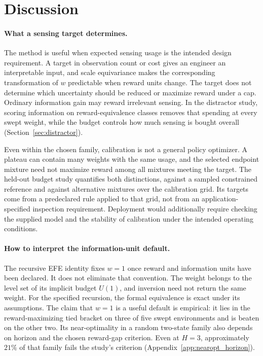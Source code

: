\section{Discussion}
\label{sec:discussion}

\paragraph{What a sensing target determines.}
The method is useful when expected sensing usage is the intended design requirement. A target in observation count or cost gives an engineer an interpretable input, and scale equivariance makes the corresponding transformation of $w$ predictable when reward units change. The target does not determine which uncertainty should be reduced or maximize reward under a cap. Ordinary information gain may reward irrelevant sensing. In the distractor study, scoring information on reward-equivalence classes removes that spending at every swept weight, while the budget controls how much sensing is bought overall (Section~\ref{sec:distractor}).

Even within the chosen family, calibration is not a general policy optimizer. A plateau can contain many weights with the same usage, and the selected endpoint mixture need not maximize reward among all mixtures meeting the target. The held-out budget study quantifies both distinctions, against a sampled constrained reference and against alternative mixtures over the calibration grid. Its targets come from a predeclared rule applied to that grid, not from an application-specified inspection requirement. Deployment would additionally require checking the supplied model and the stability of calibration under the intended operating conditions.

\paragraph{How to interpret the information-unit default.}
The recursive EFE identity fixes $w=1$ once reward and information units have been declared. It does not eliminate that convention. The weight belongs to the level set of its implicit budget $U(1)$, and inversion need not return the same weight. For the specified recursion, the formal equivalence is exact under its assumptions. The claim that $w=1$ is a useful default is empirical: it lies in the reward-maximizing tied bracket on three of five swept environments and is beaten on the other two. Its near-optimality in a random two-state family also depends on horizon and the chosen reward-gap criterion. Even at $H=3$, approximately $21\%$ of that family fails the study's criterion (Appendix~\ref{app:nearopt_horizon}).

